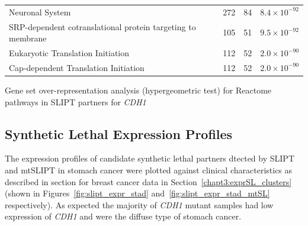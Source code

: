 \begin{table}[!ht]
{\begin{threeparttable}
\begin{tabular}{lccc}
  \rowcolor{black!10}
  Neuronal System & 272 &  84 & $8.4 \times 10^{-92}$ \\ 
  \rowcolor{black!5}
  SRP-dependent cotranslational protein targeting to membrane & 105 &  51 & $9.5 \times 10^{-92}$ \\ 
  \rowcolor{black!10}
  Eukaryotic Translation Initiation & 112 &  52 & $2.0 \times 10^{-90}$ \\ 
  \rowcolor{black!5}
  Cap-dependent Translation Initiation & 112 &  52 & $2.0 \times 10^{-90}$ \\ 
   \hline
\end{tabular}
\begin{tablenotes}
\raggedright \small
Gene set over-representation analysis (hypergeometric test) for Reactome pathways in SLIPT partners for \textit{CDH1}
\end{tablenotes}
\end{threeparttable}
}
\end{table}



\FloatBarrier

\subsection{Synthetic Lethal Expression Profiles} \label{chapt3:stad_SL_clusters}

The expression profiles of candidate synthetic lethal partners dtected by SLIPT and mtSLIPT in stomach cancer were plotted against clinical characteristics as described in section for breast cancer data in Section~\ref{chapt3:exprSL_clusters} (shown in Figures~\ref{fig:slipt_expr_stad} and~\ref{fig:slipt_expr_stad_mtSL} respectively). As expected the majority of \textit{CDH1} mutant samples had low expression of \textit{CDH1} and were the diffuse type of stomach cancer.


